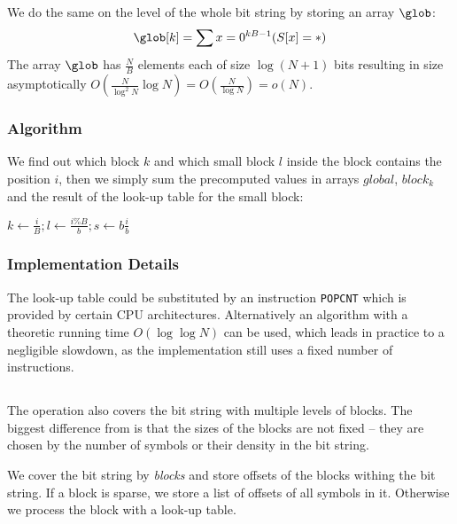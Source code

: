 We do the same on the level of the whole bit string by storing an array $\glob$:
$$ \glob[k] = \sum{x = 0}^{k B - 1} (S[x] = \ph) $$
The array $\glob$ has $\frac{N}{B}$ elements each of size $\log (N+1)$ bits resulting in size asymptotically $O(\frac{N}{\log^2 N} \log{N}) = O(\frac{N}{\log N}) = o(N)$.

\subsubsection{Algorithm}

We find out which block $k$ and which small block $l$ inside the block contains the position $i$, then we simply sum the precomputed values in arrays $global$, $block_k$ and the result of the look-up table for the small block:
\begin{algorithmic}
	\State $k \gets \frac{i}{B}; l \gets \frac{i \% B}{b}; s \gets b \frac{i}{b}$
	\State{}
\EndFunction
\end{algorithmic}

\subsubsection{Implementation Details}

The look-up table could be substituted by an instruction \verb|POPCNT| which is provided by certain CPU architectures.
Alternatively an algorithm with a theoretic running time $O(\log \log N)$ can be used, which leads in practice to a negligible slowdown, as the implementation still uses a fixed number of instructions.

\subsection{\select}


The \select{} operation also covers the bit string with multiple levels of blocks.
The biggest difference from \rank{} is that the sizes of the blocks are not fixed -- they are chosen by the number of symbols \ph{} or their density in the bit string.

We cover the bit string by \emph{blocks} and store offsets of the blocks withing the bit string.
If a block is sparse, we store a list of offsets of all symbols \ph{} in it.
Otherwise we process the block with a look-up table.

